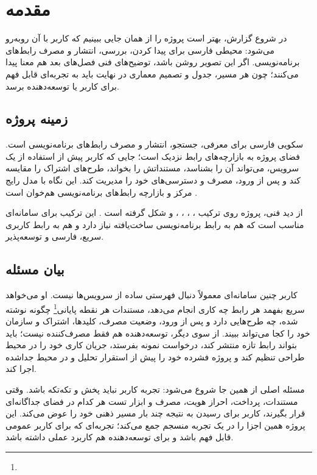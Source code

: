 \chapter{مقدمه}

در شروع گزارش، بهتر است پروژه را از همان جایی ببینیم که کاربر با آن روبه‌رو می‌شود: محیطی فارسی برای پیدا کردن، بررسی، انتشار و مصرف رابط‌های برنامه‌نویسی. اگر این تصویر روشن باشد، توضیح‌های فنی فصل‌های بعد هم معنا پیدا می‌کنند؛ چون هر مسیر، جدول و تصمیم معماری در نهایت باید به تجربه‌ای قابل فهم برای کاربر یا توسعه‌دهنده برسد.

\section{زمینه پروژه}
 سکویی فارسی برای معرفی، جستجو، انتشار و مصرف رابط‌های برنامه‌نویسی است. فضای پروژه به بازارچه‌های رابط نزدیک است؛ جایی که کاربر پیش از استفاده از یک سرویس، می‌تواند آن را بشناسد، مستنداتش را بخواند، طرح‌های اشتراک را مقایسه کند و پس از ورود، مصرف و دسترسی‌های خود را مدیریت کند. این نگاه با مدل رایج مرکز و بازارچه رابط‌های برنامه‌نویسی هم‌خوان است \cite{rapidapi}.

از دید فنی، پروژه روی ترکیب ، ، ، ،  و  شکل گرفته است \cite{python,django,drf,react,vite,mongodb,docker}. این ترکیب برای سامانه‌ای مناسب است که هم به رابط برنامه‌نویسی ساخت‌یافته نیاز دارد و هم به رابط کاربری سریع، فارسی و توسعه‌پذیر.

\section{بیان مسئله}
کاربر چنین سامانه‌ای معمولاً دنبال فهرستی ساده از سرویس‌ها نیست. او می‌خواهد سریع بفهمد هر رابط چه کاری انجام می‌دهد، مستندات هر نقطه پایانی\footnote{} چگونه نوشته شده، چه طرح‌هایی دارد و پس از ورود، وضعیت مصرف، کلیدها، اشتراک و سازمان خود را کجا می‌تواند ببیند. از سوی دیگر، توسعه‌دهنده هم فقط مصرف‌کننده نیست؛ باید بتواند رابط تازه منتشر کند، درخواست نمونه بفرستد، جریان کاری خود را در محیط طراحی تنظیم کند و پروژه فشرده خود را پیش از استقرار تحلیل و در محیط جداشده اجرا کند.

مسئله اصلی از همین جا شروع می‌شود: تجربه کاربر نباید پخش و تکه‌تکه باشد. وقتی مستندات، پرداخت، احراز هویت، مصرف و ابزار تست هر کدام در فضای جداگانه‌ای قرار بگیرند، کاربر برای رسیدن به نتیجه چند بار مسیر ذهنی خود را عوض می‌کند. این پروژه همین اجزا را در یک تجربه منسجم جمع می‌کند؛ تجربه‌ای که برای کاربر عمومی قابل فهم باشد و برای توسعه‌دهنده هم کاربرد عملی داشته باشد.


